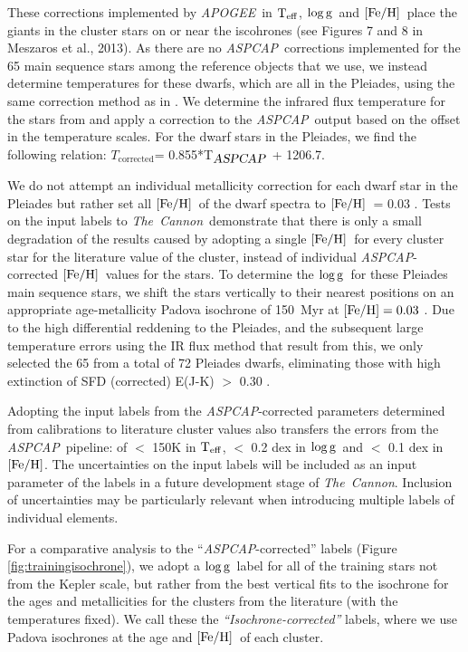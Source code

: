 \documentclass[12pt, preprint]{aastex}
\newcommand{\tc}{\textsl{The~Cannon}}
\newcommand{\apogee}{\textsl{APOGEE}}
\newcommand{\aspcap}{\textsl{ASPCAP}}
\newcommand{\teff}{\mbox{$\rm T_{eff}$}}
\newcommand{\feh}{\mbox{$\rm [Fe/H]$}}
\newcommand{\logg}{\mbox{$\rm \log g$}}
\begin{document}
These corrections implemented by \apogee\ in \teff, \logg\ and  \feh\ place the giants in the cluster stars on or near the iscohrones (see Figures 7 and 8 in Meszaros et al., 2013).  
As there are no \aspcap\ corrections implemented for the 65 main sequence stars among the reference objects that we use, 
we instead determine temperatures for these dwarfs, which are all in the Pleiades, using the same correction method 
as in \citet{Meszaros2013}. 
We determine the infrared flux temperature for the stars from \citet{gonzalez2009} and apply a correction to 
the \aspcap\ output based on the offset in the temperature scales. For the dwarf stars in the Pleiades, we find the following relation:
 $T_{\mbox{corrected}}$= 0.855*T$_{\mbox{\textit{\aspcap}}}$ + 1206.7.

We do not attempt an individual metallicity correction for each dwarf star in the Pleiades but rather set all \feh\ of the dwarf spectra to \feh\ = 0.03 \citep{barrado2001}.
Tests on the input labels to \tc\ demonstrate that there is only a small degradation of the results caused by adopting a single \feh\ for every cluster star for the literature value of the cluster, instead of individual \aspcap-corrected \feh\ values for the stars.
To determine the \logg\ for these Pleiades main sequence stars, we shift the stars vertically to their nearest positions on an appropriate age-metallicity Padova isochrone of 150~Myr at $\feh = 0.03$ \citep{girardi2000}. 
Due to the high differential reddening to the Pleiades, and the subsequent large temperature errors using the IR flux method that result from this, we only selected the 65 from a total of 72 Pleiades dwarfs, eliminating those with high extinction of SFD (corrected) E(J-K) $>$ 0.30 \citep{Schlafly2011}.

Adopting the input labels from the \aspcap-corrected parameters determined from calibrations to literature cluster values also transfers the errors from the \aspcap\ pipeline: of $<$ 150K in \teff,  $<$ 0.2 dex in \logg\ and $<$ 0.1 dex in \feh.   
The uncertainties on the input labels will be included as an input parameter of the labels in a future development stage of \tc. Inclusion of uncertainties may be particularly relevant when introducing multiple labels of individual elements. 

For a comparative analysis to the ``\aspcap-corrected'' labels (Figure \ref{fig:trainingisochrone}), we adopt a \logg\ label for all of the training stars not from the Kepler scale, but rather from the best vertical fits to the isochrone for the ages and metallicities for the clusters from the literature (with the temperatures fixed).
We call these the \textit{``Isochrone-corrected''} labels, where we use Padova isochrones at the age and \feh\ of each cluster. 
\end{document}
